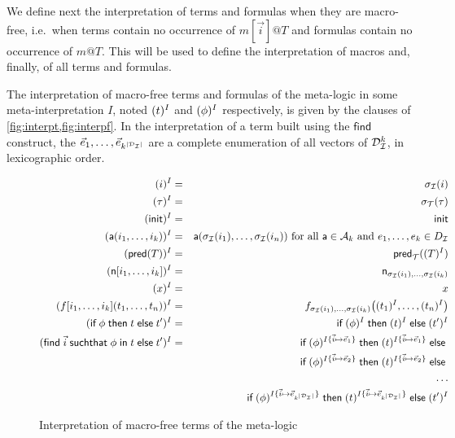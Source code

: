 We define next the interpretation of terms and formulas when they are
macro-free, i.e.\ when terms contain no occurrence of $m[\vec{i}]@T$
and formulas contain no occurrence of $m@T$. This will be used to
define the interpretation of macros and, finally, of all terms
and formulas.

\begin{definition}
  The interpretation of macro-free terms and formulas of the meta-logic in 
  some meta-interpretation $I$, noted $(t)^I$ and $(\phi)^I$ 
  respectively, is given by the clauses of \cref{fig:interpt,fig:interpf}.
  In the interpretation of a term built using the $\mathsf{find}$
  construct, the $\vec{e}_1, \ldots, \vec{e}_{k^{|\mathcal{D}_{\mathcal{I}}|}}$ are a complete
  enumeration of all vectors of $\mathcal{D}_{\mathcal{I}}^k$, in lexicographic order.
\end{definition}

\begin{figure}[t]
  \begin{eqnarray*}
    (i)^I &=& \sigma_{\mathcal{I}}(i)
    \\
    (\tau)^I &=& \sigma_{\mathcal{T}}(\tau) \\
    (\mathsf{init})^I &=& \mathsf{init} \\
    (\textsf{a}(i_1,\ldots,i_k))^I &=&
      \textsf{a}(\sigma_{\mathcal{I}}(i_1),\ldots,\sigma_{\mathcal{I}}(i_n))
      \text{ for all }
      \textsf{a}\in\mathcal{A}_k \text{ and } e_1,\ldots,e_k\in D_{\mathcal{I}} \\
    (\textsf{pred}(T))^I &=&
      \mathsf{pred}_{\mathcal{T}}((T)^I)
    \\
    (\mathsf{n}[i_1,\ldots,i_k])^I &=& \mathsf{n}_{\sigma_{\mathcal{I}}(i_1),\ldots,\sigma_{\mathcal{I}}(i_k)}
    \\
    (x)^{I} &=& x
    \\
    (f[i_1,\ldots,i_k](t_1,\ldots,t_n))^{I} &=&
    f_{\sigma_{\mathcal{I}}(i_1),\ldots,\sigma_{\mathcal{I}}(i_k)}\bigl(
      (t_1)^{I},\ldots,(t_n)^{I}
    \bigr)
    \\
    (\textsf{if}\; \phi \;\textsf{then}\; t \;\textsf{else}\; t')^I &=&
    \textsf{if}\; (\phi)^I \;\textsf{then}\; (t)^I \;\textsf{else}\; (t')^I
    \\
    (\textsf{find}\; \vec{i} \;\textsf{suchthat}\; \phi \;\textsf{in}\; t \;\textsf{else}\; t')^I &=&
    \textsf{if}\; (\phi)^{I\{\vec{i}\mapsto\vec{e}_1\}}
    \;\textsf{then}\; (t)^{I\{\vec{i}\mapsto\vec{e}_1\}}
    \;\textsf{else}\; \\ & &
    \textsf{if}\; (\phi)^{I\{\vec{i}\mapsto\vec{e}_2\}}
    \;\textsf{then}\; (t)^{I\{\vec{i}\mapsto\vec{e}_2\}}
    \;\textsf{else}\; \\ & & \ldots \\ & &
    \textsf{if}\; (\phi)^{I\{\vec{i}\mapsto\vec{e}_{k^{|\mathcal{D}_{\mathcal{I}}|}}\}}
    \;\textsf{then}\; (t)^{I\{\vec{i}\mapsto\vec{e}_{k^{|\mathcal{D}_{\mathcal{I}}|}}\}}
    \;\textsf{else}\; (t')^I
  \end{eqnarray*}
  \caption{Interpretation of macro-free terms of the meta-logic}
  \label{fig:interpt}
\end{figure}

